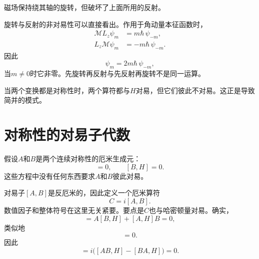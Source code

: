 \begin{classroomqa}
\end{classroomqa}

磁场保持绕其轴的旋转，但破坏了上面所用的反射。

\begin{classroomqa}
\end{classroomqa}

旋转与反射的非对易性可以直接看出。作用于角动量本征函数时，
\begin{align}
\mathcal M L_z\psi_m
&=m\hbar\,\psi_{-m},\\
L_z\mathcal M\psi_m
&=-m\hbar\,\psi_{-m}.
\end{align}
因此
\begin{equation}
[\mathcal M,L_z]\psi_m
=2m\hbar\,\psi_{-m},
\end{equation}
当\(m\neq0\)时它非零。先旋转再反射与先反射再旋转不是同一运算。

当两个变换都是对称性时，两个算符都与\(H\)对易，但它们彼此不对易。这正是导致简并的模式。

\begin{classroomqa}
\end{classroomqa}

\section{对称性的对易子代数}

假设\(A\)和\(B\)是两个连续对称性的厄米生成元：
\begin{equation}
[A,H]=0,
\qquad
[B,H]=0.
\end{equation}
这些方程中没有任何东西要求\(A\)和\(B\)彼此对易。

对易子\([A,B]\)是反厄米的，因此定义一个厄米算符
\begin{equation}
C=i[A,B].
\end{equation}
数值因子和整体符号在这里无关紧要。要点是\(C\)也与哈密顿量对易。确实，
\begin{equation}
[AB,H]
=A[B,H]+[A,H]B=0,
\end{equation}
类似地
\begin{equation}
[BA,H]=0.
\end{equation}
因此
\begin{equation}
[C,H]
=i\bigl([AB,H]-[BA,H]\bigr)=0.
\end{equation}

